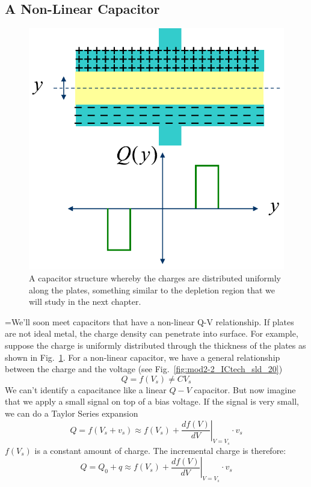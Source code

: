 \subsection{A Non-Linear Capacitor}
\begin{figure}[tb]
\centering
\includegraphics[width=.5\columnwidth]{mod2-2_ICtech_sld_20b} 
\caption{A capacitor structure whereby the charges are distributed uniformly along the plates, something similar to the depletion region that we will study in the next chapter.}
\label{fig:mod2-2_ICtech_sld_20b}
\end{figure}
=We’ll soon meet capacitors that have a non-linear Q-V relationship.  
 If plates are not ideal metal, the charge density can penetrate into surface.  For example, suppose the charge is uniformly distributed through the thickness of the plates as shown in Fig.~\ref{fig:mod2-2_ICtech_sld_20b}.
For a non-linear capacitor, we have a general relationship between the charge and the voltage (see Fig.~\ref{fig:mod2-2_ICtech_sld_20})
    \begin{equation} 
        Q = f({V_s}) \ne C{V_s} 
    \end{equation}
We can’t identify a capacitance like a linear $Q-V$ capacitor.  But now imagine that  we apply a small signal on top of a bias voltage.  If the signal is very small, we can do a Taylor Series expansion
    \begin{equation} 
        Q = f({V_s} + {v_s}) \approx f({V_s}) + {\left. {\frac{{df(V)}}{{dV}}} \right|_{V = {V_s}}} \cdot {v_s} 
    \end{equation}
$f(V_s)$ is a constant amount of charge.  The incremental charge is therefore:
    \begin{equation} 
        Q = {Q_0} + q \approx f({V_s}) + {\left. {\frac{{df(V)}}{{dV}}} \right|_{V = {V_s}}} \cdot {v_s} 
    \end{equation}
